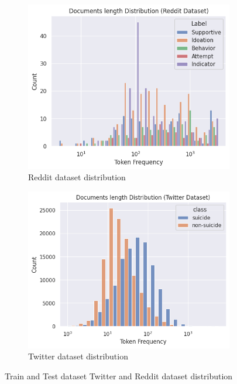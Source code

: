 \documentclass[sn-mathphys,Numbered]{sn-jnl}%
\theoremstyle{thmstyleone}%
\theoremstyle{thmstyletwo}%
\theoremstyle{thmstylethree}%
\begin{document}
\begin{figure}[h!]
\centering
\begin{subfigure}{0.45\textwidth}
    \includegraphics[width=\textwidth]{reddit_dist.png}
    \caption{Reddit dataset distribution}
    \label{redditdist}
\end{subfigure}
\hfill
\begin{subfigure}{0.45\textwidth}
    \includegraphics[width=\textwidth]{twitterdist.png}
    \caption{Twitter dataset distribution}
    \label{twitterdist}
\end{subfigure}       
\caption{Train and Test dataset Twitter and Reddit dataset distribution}
\label{redditdist_twitterdist}
\end{figure}
\end{document}
